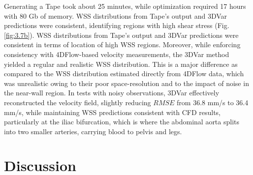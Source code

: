 Generating a Tape took about 25 minutes, while optimization required 17 hours with 80 Gb of memory. WSS distributions from Tape's output and 3DVar predictions were consistent, identifying regions with high shear stress (Fig. \ref{fig:3.7b}). WSS distributions from Tape's output and 3DVar predictions were consistent in terms of location of high WSS regions. Moreover, while enforcing consistency with 4DFlow-based velocity measurements, the 3DVar method yielded a regular and realistic WSS distribution. This is a major difference as compared to the WSS distribution estimated directly from 4DFlow data, which was unrealistic owing to their poor space-resolution and to the impact of noise in the near-wall region. In tests with noisy observations, 3DVar effectively reconstructed the velocity field, slightly reducing \(RMSE\) from 36.8 mm/s to 36.4 mm/s, while maintaining WSS predictions consistent with CFD results, particularly at the iliac bifurcation, which is where the abdominal aorta splits into two smaller arteries, carrying blood to pelvis and legs.


\section*{Discussion}
%
